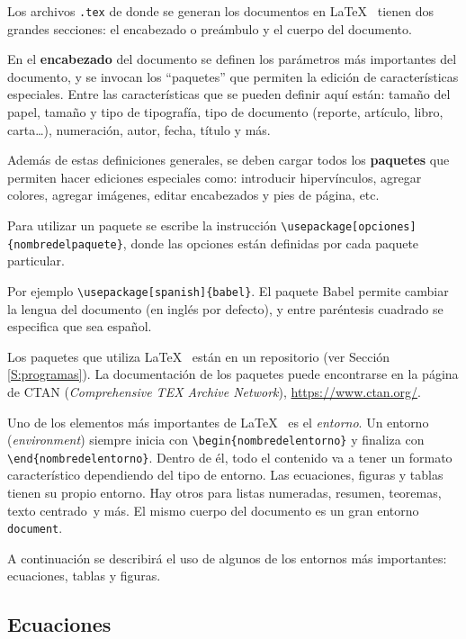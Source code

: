 Los archivos \texttt{.tex} de donde se generan los documentos en \LaTeX~ tienen dos grandes secciones: el encabezado o preámbulo y el cuerpo del documento.

En el \textbf{encabezado} del documento se definen los parámetros más importantes del documento, y se invocan los ``paquetes'' que permiten la edición de características especiales. Entre las características que se pueden definir aquí están: tamaño del papel, tamaño y tipo de tipografía, tipo de documento (reporte, artículo, libro, carta\ldots), numeración, autor, fecha, título y más. 

Además de estas definiciones generales, se deben cargar todos los \textbf{paquetes} que permiten hacer ediciones especiales como: introducir hipervínculos, agregar colores, agregar imágenes, editar encabezados y pies de página, etc. 

Para utilizar un paquete se escribe la instrucción \verb+\usepackage[opciones]{nombredelpaquete}+, donde las opciones están definidas por cada paquete particular. 

Por ejemplo \verb+\usepackage[spanish]{babel}+. El paquete Babel permite cambiar la lengua del documento (en inglés por defecto), y entre paréntesis cuadrado se especifica que sea español.

Los paquetes que utiliza \LaTeX~ están en un repositorio (ver Sección \ref{S:programas}). La documentación de los paquetes puede encontrarse en la página de CTAN (\textit{Comprehensive TEX Archive Network}), \url{https://www.ctan.org/}.

Uno de los elementos más importantes de \LaTeX~ es el \emph{entorno}. Un entorno (\emph{environment}) siempre inicia con \verb+\begin{nombredelentorno}+ y finaliza con \verb+\end{nombredelentorno}+. Dentro de él, todo el contenido va a tener un formato característico dependiendo del tipo de entorno. Las ecuaciones, figuras y tablas tienen su propio entorno. Hay otros para listas numeradas, resumen, teoremas, texto centrado\ y más. El mismo cuerpo del documento es un gran entorno \texttt{document}.

A continuación se describirá el uso de algunos de los entornos más importantes: ecuaciones, tablas y figuras.

\subsection{Ecuaciones}

